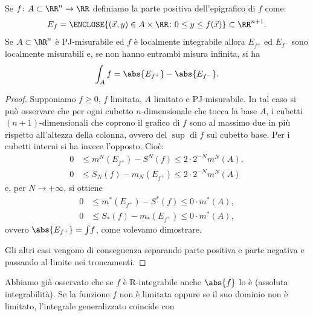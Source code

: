 \begin{theorem}
  \label{th:significato-geometrico-integrale}
Se $f\colon A\subset \RR^n \to \RR$ definiamo la parte positiva dell'epigrafico di $f$
come:
\[
  E_f = \ENCLOSE{(\vec x,y)\in A\times \RR \colon 0 \le y \le f(\vec x)} \subset \RR^{n+1}.
\]
Se $A\subset \RR^n$ è PJ-misurabile ed $f$ è localmente integrabile 
allora $E_{f^+}$ ed $E_{f^-}$ sono localmente misurabili e, se non
hanno entrambi misura infinita, si ha 
\[
  \int_A f = \abs{E_{f^+}} - \abs{E_{f^-}}.
\]
\end{theorem}

\begin{proof}
Supponiamo $f\ge 0$, $f$ limitata, $A$ limitato e PJ-misurabile.
In tal caso si può osservare che 
per ogni cubetto $n$-dimensionale che tocca la base $A$, 
i cubetti $(n+1)$-dimensionali che coprono il grafico di $f$ 
sono al massimo due in più rispetto all'altezza della colonna, 
ovvero del $\sup$ di $f$ sul cubetto base. 
Per i cubetti interni si ha invece l'opposto. Cioè:
\begin{align*}
    0 & \le m^N(E_{f^+}) - S^N(f) \le 2\cdot 2^{-N} m^N(A),\\
    0 & \le S_N(f) - m_N(E_{f^+}) \le 2\cdot 2^{-N} m^N(A)
\end{align*}
e, per $N\to +\infty$, si ottiene 
\begin{align*}
  0 &\le m^*(E_{f^+}) - S^*(f) \le 0\cdot m^*(A), \\
  0 &\le S_*(f) - m_*(E_{f^+}) \le 0\cdot m^*(A), 
\end{align*}
ovvero $\abs{E_{f^+}}=\int\! f$, come volevamo dimostrare.

Gli altri casi vengono di conseguenza separando parte positiva e parte negativa 
e passando al limite nei troncamenti.
\end{proof}

\begin{remark}
Abbiamo già osservato che se $f$ è R-integrabile
anche $\abs{f}$ lo è (assoluta integrabilità).
Se la funzione $f$ non è limitata oppure se il suo dominio non è limitato, 
l'integrale generalizzato coincide con 
\end{remark}


